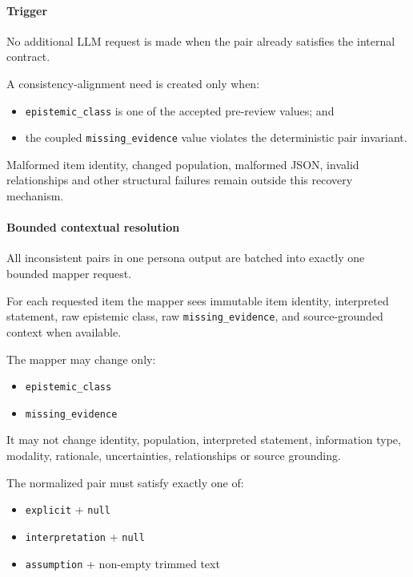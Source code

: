 \hypertarget{trigger}{%
\paragraph{Trigger}\label{trigger}}

No additional LLM request is made when the pair already satisfies the internal contract.

A consistency-alignment need is created only when:

\begin{itemize}
\tightlist
\item
  \texttt{epistemic\_class} is one of the accepted pre-review values; and
\item
  the coupled \texttt{missing\_evidence} value violates the deterministic pair invariant.
\end{itemize}

Malformed item identity, changed population, malformed JSON, invalid relationships and other structural failures remain outside this recovery mechanism.

\hypertarget{bounded-contextual-resolution}{%
\paragraph{Bounded contextual resolution}\label{bounded-contextual-resolution}}

All inconsistent pairs in one persona output are batched into exactly one bounded mapper request.

For each requested item the mapper sees immutable item identity, interpreted statement, raw epistemic class, raw \texttt{missing\_evidence}, and source-grounded context when available.

The mapper may change only:

\begin{itemize}
\tightlist
\item
  \texttt{epistemic\_class}
\item
  \texttt{missing\_evidence}
\end{itemize}

It may not change identity, population, interpreted statement, information type, modality, rationale, uncertainties, relationships or source grounding.

The normalized pair must satisfy exactly one of:

\begin{itemize}
\tightlist
\item
  \texttt{explicit} + \texttt{null}
\item
  \texttt{interpretation} + \texttt{null}
\item
  \texttt{assumption} + non-empty trimmed text
\end{itemize}

